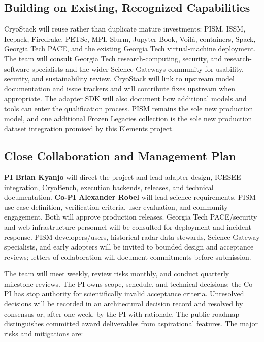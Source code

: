 \subsection{Building on Existing, Recognized Capabilities}

CryoStack will reuse rather than duplicate mature investments: PISM, ISSM,
Icepack, Firedrake, PETSc, MPI, Slurm, Jupyter Book, Voilà, containers, Spack,
Georgia Tech PACE, and the existing Georgia Tech virtual-machine deployment.
The team will consult Georgia Tech research-computing, security, and
research-software specialists and the wider Science Gateways community for
usability, security, and sustainability review. CryoStack will link to upstream model documentation and
issue trackers and will contribute fixes upstream when appropriate.
The adapter SDK will also document how additional models and tools can enter
the qualification process. PISM remains the sole new production model, and one
additional Frozen Legacies collection is the sole new production dataset
integration promised by this Elements project.

\subsection{Close Collaboration and Management Plan}

\textbf{PI Brian Kyanjo} will direct the project and lead adapter design,
ICESEE integration, CryoBench, execution backends, releases, and technical
documentation. \textbf{Co-PI Alexander Robel} will lead science requirements,
PISM use-case definition, verification criteria, user evaluation, and
community engagement. Both will approve production releases. Georgia Tech
PACE/security and web-infrastructure personnel will be consulted for
deployment and incident response. PISM developers/users, historical-radar
data stewards, Science Gateway specialists, and early adopters will be invited to bounded design and
acceptance reviews; letters of collaboration will document commitments before
submission.

The team will meet weekly, review risks monthly, and conduct quarterly
milestone reviews. The PI owns scope, schedule, and technical decisions; the
Co-PI has stop authority for scientifically invalid acceptance criteria.
Unresolved decisions will be recorded in an architectural decision record and
resolved by consensus or, after one week, by the PI with rationale. The public
roadmap distinguishes committed award deliverables from aspirational features.
The major risks and mitigations are:

